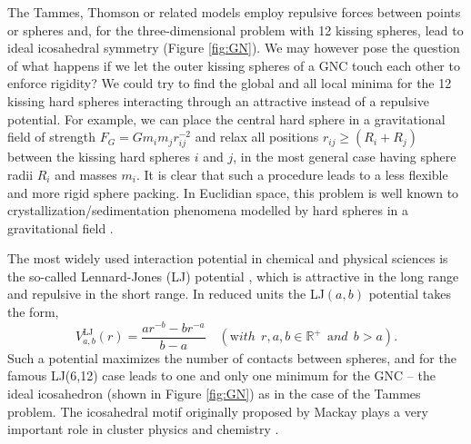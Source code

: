 The Tammes, Thomson  or related models employ repulsive forces between points
or spheres \autocite{Wales_Structuredynamicsspherical_2006,Wales_Defectmotifsspherical_2009} and, for the
three-dimensional problem with 12 kissing spheres, lead to ideal icosahedral
symmetry (Figure \ref{fig:GN}). We may however pose the question of what
happens if we let the outer kissing spheres of a \ac{GNC} touch each other to
enforce rigidity? We could try to find the global and all local minima for the
12 kissing hard spheres interacting through an attractive instead of a
repulsive potential. For example, we can place the central hard sphere in a
gravitational field of strength $F_G=Gm_im_jr_{ij}^{-2}$ and relax all
positions $r_{ij}\ge (R_i+R_j)$ between the kissing hard spheres $i$ and $j$,
in the most general case having sphere radii $R_i$ and masses $m_i$. It is
clear that such a procedure leads to a less flexible and more rigid sphere
packing. In Euclidian space, this problem is well known to
crystallization/sedimentation phenomena modelled by hard spheres in a
gravitational field \autocite{Levin_Crystallizationhardspheres_2000,Pusey_Hardspherescrystallization_2009}.

The most widely used interaction potential in chemical and physical sciences is
the so-called Lennard-Jones (LJ) potential
\autocite{Jones_DeterminationMolecularFields_1924,Lennard-Jones_Cohesion_1931},
which is attractive in the long range and repulsive in the short range. In
reduced units the LJ$(a,b)$ potential takes the form, 
\begin{equation}
V_{a,b}^\mathrm{LJ}(r)=\frac{ar^{-b}-br^{-a}}{b-a} \quad ({\mathrm with} \ \ r,a,b \in \mathbb{R}^+ \ \ {\mathrm and} \ \ b>a).
\label{eqn:abpot}
\end{equation}
Such a potential maximizes the number of contacts between spheres, and for the
famous LJ(6,12) case leads to one and only one minimum for the \ac{GNC}
\autocite{Trombach_stickyhardsphereLennardJonestypeclusters_2018} -- the ideal icosahedron (shown in Figure \ref{fig:GN}) as
in the case of the Tammes problem. The icosahedral motif originally proposed by
Mackay \autocite{Mackay-1962} plays a very important role in cluster physics and
chemistry
\autocite{Hoare_Physicalclustermechanics_1975,Klots90,Uppenbrink-1991,vandewaal93,Wales_Whatcancalculations_1996,Wales_ChangesMorphologyCapping_1996,Wales_Structuredynamicsspherical_2006}.

